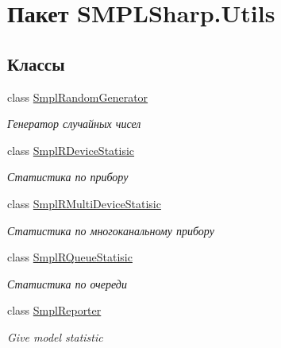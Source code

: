 \hypertarget{namespace_s_m_p_l_sharp_1_1_utils}{\section{Пакет S\-M\-P\-L\-Sharp.\-Utils}
\label{d4/de6/namespace_s_m_p_l_sharp_1_1_utils}
}
\subsection*{Классы}
\begin{DoxyCompactItemize}
\item 
class \hyperlink{class_s_m_p_l_sharp_1_1_utils_1_1_smpl_random_generator}{Smpl\-Random\-Generator}
\begin{DoxyCompactList}\small\item\em Генератор случайных чисел \end{DoxyCompactList}\item 
class \hyperlink{class_s_m_p_l_sharp_1_1_utils_1_1_smpl_r_device_statisic}{Smpl\-R\-Device\-Statisic}
\begin{DoxyCompactList}\small\item\em Статистика по прибору \end{DoxyCompactList}\item 
class \hyperlink{class_s_m_p_l_sharp_1_1_utils_1_1_smpl_r_multi_device_statisic}{Smpl\-R\-Multi\-Device\-Statisic}
\begin{DoxyCompactList}\small\item\em Статистика по многоканальному прибору \end{DoxyCompactList}\item 
class \hyperlink{class_s_m_p_l_sharp_1_1_utils_1_1_smpl_r_queue_statisic}{Smpl\-R\-Queue\-Statisic}
\begin{DoxyCompactList}\small\item\em Статистика по очереди \end{DoxyCompactList}\item 
class \hyperlink{class_s_m_p_l_sharp_1_1_utils_1_1_smpl_reporter}{Smpl\-Reporter}
\begin{DoxyCompactList}\small\item\em Give model statistic \end{DoxyCompactList}\end{DoxyCompactItemize}
